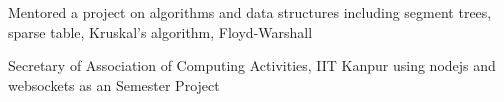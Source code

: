 
\begin{itemize}
  {\Large
  \item Mentored a project on algorithms and data structures including segment trees, sparse table, Kruskal's algorithm, Floyd-Warshall\vspace{1mm}
  \item Secretary of Association of Computing Activities, IIT Kanpur \vspace{1.5mm}
    \ifdefined \ONEPAGE \else
    using nodejs and
    websockets as an Semester Project
    \fi
    \vspace{2mm}
    }
\end{itemize}